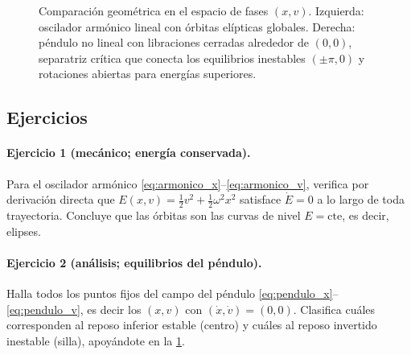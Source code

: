\begin{figure}[htbp]
\caption{Comparación geométrica en el espacio de fases $(x, v)$. Izquierda: oscilador armónico lineal con órbitas elípticas globales. Derecha: péndulo no lineal con libraciones cerradas alrededor de $(0,0)$, separatriz crítica que conecta los equilibrios inestables $(\pm\pi, 0)$ y rotaciones abiertas para energías superiores.}
\label{fig:retratos_fase_poincare}
\end{figure}

\subsection{Ejercicios}

\paragraph{Ejercicio 1 (mecánico; energía conservada).} Para el oscilador armónico \eqref{eq:armonico_x}--\eqref{eq:armonico_v}, verifica por derivación directa que $E(x,v)=\tfrac12 v^2 + \tfrac12\omega^2 x^2$ satisface $\dot{E}=0$ a lo largo de toda trayectoria. Concluye que las órbitas son las curvas de nivel $E=\text{cte}$, es decir, elipses.

\paragraph{Ejercicio 2 (análisis; equilibrios del péndulo).} Halla todos los puntos fijos del campo del péndulo \eqref{eq:pendulo_x}--\eqref{eq:pendulo_v}, es decir los $(x,v)$ con $(\dot x,\dot v)=(0,0)$. Clasifica cuáles corresponden al reposo inferior estable (centro) y cuáles al reposo invertido inestable (silla), apoyándote en la \cref{fig:retratos_fase_poincare}.

